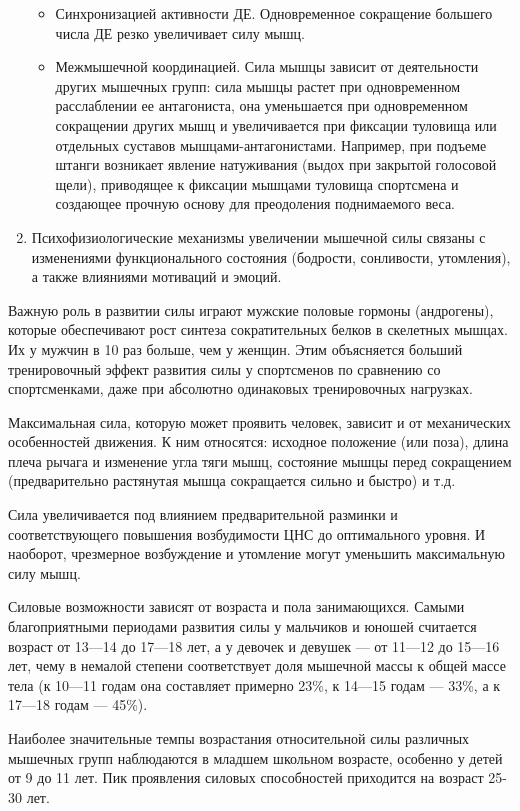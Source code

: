 \begin{enumerate}
\begin{itemize}
        \item Синхронизацией активности ДЕ. Одновременное сокращение большего числа ДЕ резко увеличивает силу мышц.
        \item Межмышечной координацией. Сила мышцы зависит от деятельности других мышечных групп: сила мышцы растет при одновременном расслаблении ее антагониста, она уменьшается при одновременном сокращении других мышц и увеличивается при фиксации туловища или отдельных суставов мышцами-антагонистами. Например, при подъеме штанги возникает явление натуживания (выдох при закрытой голосовой щели), приводящее к фиксации мышцами туловища спортсмена и создающее прочную основу для преодоления поднимаемого веса.
    \end{itemize}
    \item Психофизиологические механизмы увеличении мышечной силы связаны с изменениями функционального состояния (бодрости, сонливости, утомления), а также влияниями мотиваций и эмоций.
\end{enumerate}

Важную роль в развитии силы играют мужские половые гормоны (андрогены), которые обеспечивают рост синтеза сократительных белков в скелетных мышцах. Их у мужчин в 10 раз больше, чем у женщин. Этим объясняется больший тренировочный эффект развития силы у спортсменов по сравнению со спортсменками, даже при абсолютно одинаковых тренировочных нагрузках.

Максимальная сила, которую может проявить человек, зависит и от механических особенностей движения. К ним относятся: исходное положение (или поза), длина плеча рычага и изменение угла тяги мышц, состояние мышцы перед сокращением (предварительно растянутая мышца сокращается сильно и быстро) и т.д.

Сила увеличивается под влиянием предварительной разминки и соответствующего повышения возбудимости ЦНС до оптимального уровня. И наоборот, чрезмерное возбуждение и утомление могут уменьшить максимальную силу мышц.

Силовые возможности зависят от возраста и пола занимающихся. Самыми благоприятными периодами развития силы у мальчиков и юношей считается возраст от 13—14 до 17—18 лет, а у девочек и девушек — от 11—12 до 15—16 лет, чему в немалой степени соответствует доля мышечной массы к общей массе тела (к 10—11 годам она составляет примерно 23\%, к 14—15 годам — 33\%, а к 17—18 годам — 45\%).

Наиболее значительные темпы возрастания относительной силы различных мышечных групп наблюдаются в младшем школьном возрасте, особенно у детей от 9 до 11 лет. Пик проявления силовых способностей приходится на возраст 25-30 лет.

